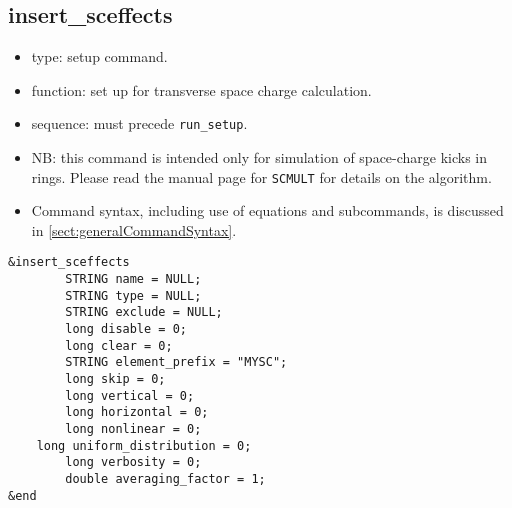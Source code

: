 \documentclass[11pt]{article}
\begin{document}
\subsection{insert\_sceffects \label{subsec:insertsceffects}}

\begin{itemize}
\item type: setup command.
\item function: set up for transverse space charge calculation.  
\item sequence: must precede \verb|run_setup|.
\item NB: this command is intended only for simulation of space-charge kicks in rings. Please read the manual page
  for \verb|SCMULT| for details on the algorithm.
\item Command syntax, including use of equations and subcommands, is discussed in \ref{sect:generalCommandSyntax}.
\end{itemize}

\begin{verbatim}
&insert_sceffects
        STRING name = NULL;
        STRING type = NULL;
        STRING exclude = NULL;
        long disable = 0;
        long clear = 0;
        STRING element_prefix = "MYSC";
        long skip = 0;
        long vertical = 0;
        long horizontal = 0;
        long nonlinear = 0;
	long uniform_distribution = 0;
        long verbosity = 0;
        double averaging_factor = 1;
&end
\end{verbatim}
\end{document}
